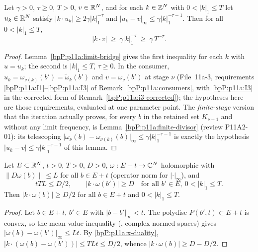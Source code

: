 \begin{lemma}\label{bpP:p11a:divisor-wide}
Let $\gamma>0$, $\tau\ge0$, $T>0$, $v\in\mathbb{R}^N$, and for each $k\in\mathbb{Z}^N$ with $0<\lvert k\rvert_1\le T$ let $u_k\in\mathbb{R}^N$ satisfy $\lvert k\cdot u_k\rvert\ge2\gamma\lvert k\rvert_1^{-\tau}$ and $\lvert u_k-v\rvert_\infty\le\gamma\lvert k\rvert_1^{-\tau-1}$. Then for all $0<\lvert k\rvert_1\le T$,
\[\lvert k\cdot v\rvert\ \ge\ \gamma\lvert k\rvert_1^{-\tau}\ \ge\ \gamma\,T^{-\tau}.\]
\end{lemma}
\begin{proof}
Lemma~\ref{bpP:p11a:limit-bridge} gives the first inequality for each $k$ with $u=u_k$; the second is $\lvert k\rvert_1\le T$, $\tau\ge0$. In the consumer, $u_k=\omega_{\nu(k)}(b')=\tilde\omega_k(b')$ and $v=\omega_\nu(b')$ at stage $\nu$ (File~11a-3, requirements \ref{bpP:p11a:I1}--\ref{bpP:p11a:I3} of Remark~\ref{bpP:p11a:consumers}, with \ref{bpP:p11a:I3} in the corrected form of Remark~\ref{bpP:p11a:i3-corrected}); the hypotheses here are those requirements, evaluated at one parameter point. The \emph{finite-stage} version that the iteration actually proves, for every $b$ in the retained set $K_{\nu+1}$ and without any limit frequency, is Lemma~\ref{bpP:p11a:finite-divisor} (review P11A2-01): its telescoping $\lvert\omega_\nu(b)-\omega_{\nu(k)}(b)\rvert_\infty\le\gamma\lvert k\rvert_1^{-\tau-1}$ is exactly the hypothesis $\lvert u_k-v\rvert\le\gamma\lvert k\rvert_1^{-\tau-1}$ of this lemma.
\end{proof}

\begin{lemma}\label{bpP:p11a:divisor-perturb}
Let $E\subset\mathbb{R}^N$, $t>0$, $T>0$, $D>0$, $\omega:E+t\to\mathbb{C}^N$ holomorphic with $\lVert D\omega(b)\rVert\le L$ for all $b\in E+t$ (operator norm for $\lvert\cdot\rvert_\infty$), and
\[tTL\le D/2,\qquad \lvert k\cdot\omega(b')\rvert\ge D\quad\text{for all }b'\in E,\ 0<\lvert k\rvert_1\le T.\]
Then $\lvert k\cdot\omega(b)\rvert\ge D/2$ for all $b\in E+t$ and $0<\lvert k\rvert_1\le T$.
\end{lemma}
\begin{proof}
Let $b\in E+t$, $b'\in E$ with $\lvert b-b'\rvert_\infty<t$. The polydisc $P(b',t)\subset E+t$ is convex, so the mean value inequality (, complex normed spaces) gives $\lvert\omega(b)-\omega(b')\rvert_\infty\le Lt$. By \ref{bpP:p11a:x-duality}, $\lvert k\cdot(\omega(b)-\omega(b'))\rvert\le TLt\le D/2$, whence $\lvert k\cdot\omega(b)\rvert\ge D-D/2$.
\end{proof}

